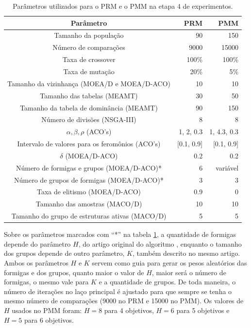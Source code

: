 \begin{table}[!htbp]
	\caption{Parâmetros utilizados para o PRM e o PMM na etapa 4 de experimentos.}
	\label{table_exp4_params}
	\begin{center}
		\begin{tabular}{c|r|r}
			\textbf{Parâmetro} & \textbf{PRM} &  \textbf{PMM} \\ %
			\hline
			Tamanho da população               &    90 &      150 \\ %
			Número de comparações        &   9000 &      15000 \\ %
			Taxa de crossover                & 100\% &    100\% \\ %
			Taxa de mutação                 &  20\% &      5\% \\ %
			Tamanho da vizinhança (MOEA/D e MOEA/D-ACO)    &    10 &       10 \\ %
			Tamanho das tabelas (MEAMT)   &    30 &       50 \\ %
			Tamanho da tabela de dominância (MEAMT) &    90 &      150 \\ %
			Número de divisões (NSGA-III)&     8 &        8 \\ %
			$\alpha, \beta, \rho$ (ACO's)& 1, 2, 0.3 & 1, 4.3, 0.3 \\ %
			Intervalo de valores para os feromônios (ACO's)& [0.1, 0.9] & [0.1, 0.9] \\ %
			$\delta$ (MOEA/D-ACO)& 0.2 & 0.2 \\ %
			Número de formigas e grupos (MOEA/D-ACO)*& 6 & variável \\ %
			Número de grupos de formigas (MOEA/D-ACO)*& 3 & 3 \\ %
			Taxa de elitismo (MOEA/D-ACO)& 0.9 & 0 \\ %
			Tamanho das amostras (MACO/D)& 10 & 10 \\  %
			Tamanho do grupo de estruturas ativas (MACO/D)& 5 & 5 \\
			\hline
		\end{tabular}
	\end{center}
\end{table}

Sobre os parâmetros marcados com ``*'' na tabela \ref{table_exp4_params}, a quantidade de formigas depende do parâmetro $H$, do artigo original do algoritmo \cite{Ke2013}, enquanto o tamanho dos grupos depende de outro parâmetro, $K$, também descrito no mesmo artigo. Ambos os parâmetros $H$ e $K$ servem como guia para gerar os pesos aleatórios das formigas e dos grupos, quanto maior o valor de $H$, maior será o número de formigas, o mesmo vale para $K$ e a quantidade de grupos. De toda maneira, o número de iterações no laço principal é ajustado para que sempre se tenha o mesmo número de comparações (9000 no PRM e 15000 no PMM). Os valores de $H$ usados no PMM foram: $H=8$ para 4 objetivos, $H=6$ para 5 objetivos e $H=5$ para 6 objetivos.

